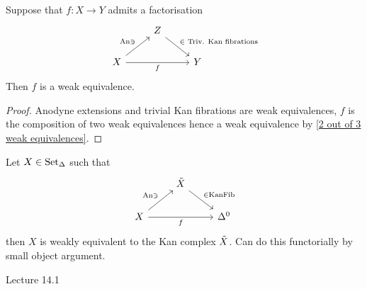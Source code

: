 \begin{cor}
    Suppose that $f \colon X \to Y$ admits a factorisation 
    \[
    \begin{tikzcd}
        &
        Z
        \ar[rd, "\in \text{ Triv. Kan fibrations}"]
        &
        \\
        X
        \ar[ru, "\An \ni"]
        \ar[rr, "f"']
        &&
        Y
    \end{tikzcd}
    \]
    Then $f$ is a weak equivalence.
\end{cor}

\begin{proof}
    Anodyne extensions and trivial Kan fibrations are weak equivalences, $f$ is the composition of two weak equivalences hence a weak equivalence by \cref{2 out of 3 weak equivalences}.
\end{proof}

Let $X \in \operatorname{Set}_{\Delta}$ such that
\[
    \begin{tikzcd}
        &
        \Tilde{X}
        \ar[rd, "\in \KanFib"]
        &
        \\
        X
        \ar[ru, "\An \ni"]
        \ar[rr, "f"']
        &&
        \Delta^0
    \end{tikzcd}
\]
then $X$ is weakly equivalent to the Kan complex $\Tilde{X}$.
Can do this functorially by small object argument.


Lecture 14.1

